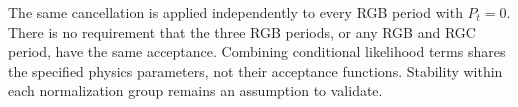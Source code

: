 % 
The same cancellation is applied independently to every RGB period with $P_t=0$. There is no requirement that the three RGB periods, or any RGB and RGC period, have the same acceptance. Combining conditional likelihood terms shares the specified physics parameters, not their acceptance functions. Stability within each normalization group remains an assumption to validate.
